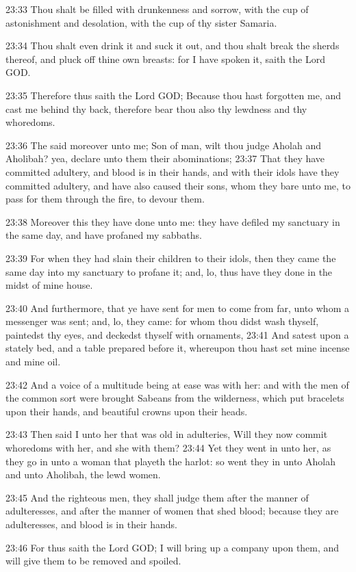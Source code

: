 23:33 Thou shalt be filled with drunkenness and sorrow, with the cup of astonishment and desolation, with the cup of thy sister Samaria.

23:34 Thou shalt even drink it and suck it out, and thou shalt break the sherds thereof, and pluck off thine own breasts: for I have spoken it, saith the Lord GOD.

23:35 Therefore thus saith the Lord GOD; Because thou hast forgotten me, and cast me behind thy back, therefore bear thou also thy lewdness and thy whoredoms.

23:36 The \LORD said moreover unto me; Son of man, wilt thou judge Aholah and Aholibah? yea, declare unto them their abominations; 23:37 That they have committed adultery, and blood is in their hands, and with their idols have they committed adultery, and have also caused their sons, whom they bare unto me, to pass for them through the fire, to devour them.

23:38 Moreover this they have done unto me: they have defiled my sanctuary in the same day, and have profaned my sabbaths.

23:39 For when they had slain their children to their idols, then they came the same day into my sanctuary to profane it; and, lo, thus have they done in the midst of mine house.

23:40 And furthermore, that ye have sent for men to come from far, unto whom a messenger was sent; and, lo, they came: for whom thou didst wash thyself, paintedst thy eyes, and deckedst thyself with ornaments, 23:41 And satest upon a stately bed, and a table prepared before it, whereupon thou hast set mine incense and mine oil.

23:42 And a voice of a multitude being at ease was with her: and with the men of the common sort were brought Sabeans from the wilderness, which put bracelets upon their hands, and beautiful crowns upon their heads.

23:43 Then said I unto her that was old in adulteries, Will they now commit whoredoms with her, and she with them?  23:44 Yet they went in unto her, as they go in unto a woman that playeth the harlot: so went they in unto Aholah and unto Aholibah, the lewd women.

23:45 And the righteous men, they shall judge them after the manner of adulteresses, and after the manner of women that shed blood; because they are adulteresses, and blood is in their hands.

23:46 For thus saith the Lord GOD; I will bring up a company upon them, and will give them to be removed and spoiled.

